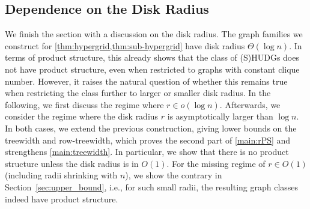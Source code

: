 \documentclass[a4paper,english,cleveref,thm-restate]{lipics-v2021}
\newcommand{\Thomas}[1]{\todo[inline,caption=,backgroundcolor=blue!25]{#1}}
\begin{document}
% 
% 


\subsection{Dependence on the Disk Radius}
\label{sec:disk-radius}


We finish the section with a discussion on the disk radius.
The graph families we construct for \cref{thm:hypergrid,thm:sub-hypergrid} have disk radius $ \Theta(\log n) $.
In terms of product structure, this already shows that the class of (S)HUDGs does not have product structure, even when restricted to graphs with constant clique number.
However, it raises the natural question of whether this remains true when restricting the class further to larger or smaller disk radius.
In the following, we first discuss the regime where $r \in o(\log n)$.
Afterwards, we consider the regime where the disk radius $r$ is asymptotically larger than $\log n$.
In both cases, we extend the previous construction, giving lower bounds on the treewidth and row-treewidth, which proves the second part of \cref{main:rPS} and strengthens \cref{main:treewidth}.
In particular, we show that there is no product structure unless the disk radius is in $ O(1) $.
For the missing regime of $r \in O(1)$ (including radii shrinking with $n$), we show the contrary in Section~\ref{sec:upper_bound}, i.e., for such small radii, the resulting graph classes indeed have product structure.
\end{document}
